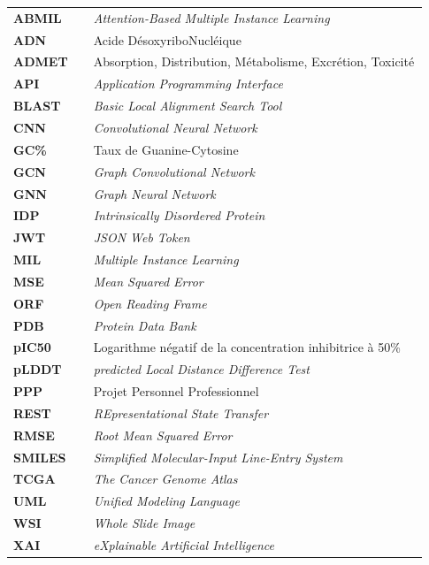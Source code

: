 \documentclass[12pt,a4paper,oneside]{book}
\begin{document}
\begin{longtable}{p{0.18\linewidth} p{0.75\linewidth}}
\textbf{ABMIL}    & \textit{Attention-Based Multiple Instance Learning} \\
\textbf{ADN}      & Acide DésoxyriboNucléique \\
\textbf{ADMET}    & Absorption, Distribution, Métabolisme, Excrétion, Toxicité \\
\textbf{API}      & \textit{Application Programming Interface} \\
\textbf{BLAST}    & \textit{Basic Local Alignment Search Tool} \\
\textbf{CNN}      & \textit{Convolutional Neural Network} \\
\textbf{GC\%}     & Taux de Guanine-Cytosine \\
\textbf{GCN}      & \textit{Graph Convolutional Network} \\
\textbf{GNN}      & \textit{Graph Neural Network} \\
\textbf{IDP}      & \textit{Intrinsically Disordered Protein} \\
\textbf{JWT}      & \textit{JSON Web Token} \\
\textbf{MIL}      & \textit{Multiple Instance Learning} \\
\textbf{MSE}      & \textit{Mean Squared Error} \\
\textbf{ORF}      & \textit{Open Reading Frame} \\
\textbf{PDB}      & \textit{Protein Data Bank} \\
\textbf{pIC50}    & Logarithme négatif de la concentration inhibitrice à 50\% \\
\textbf{pLDDT}    & \textit{predicted Local Distance Difference Test} \\
\textbf{PPP}      & Projet Personnel Professionnel \\
\textbf{REST}     & \textit{REpresentational State Transfer} \\
\textbf{RMSE}     & \textit{Root Mean Squared Error} \\
\textbf{SMILES}   & \textit{Simplified Molecular-Input Line-Entry System} \\
\textbf{TCGA}     & \textit{The Cancer Genome Atlas} \\
\textbf{UML}      & \textit{Unified Modeling Language} \\
\textbf{WSI}      & \textit{Whole Slide Image} \\
\textbf{XAI}      & \textit{eXplainable Artificial Intelligence} \\
\end{longtable}
\end{document}
